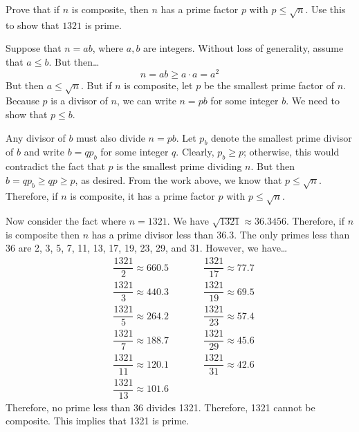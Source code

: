 \documentclass[11pt,letterpaper]{article}
\begin{document}
\newpage



 Prove that if $n$ is composite, then $n$ has a prime factor $p$ with $p \leq \sqrt{n}$. Use this to show that $1321$ is prime. \pspace

\sol Suppose that $n= ab$, where $a, b$ are integers. Without loss of generality, assume that $a \leq b$. But then\dots
	\[
	n= ab \geq a \cdot a= a^2
	\]
But then $a \leq \sqrt{n}$. But if $n$ is composite, let $p$ be the smallest prime factor of $n$. Because $p$ is a divisor of $n$, we can write $n= pb$ for some integer $b$. We need to show that $p \leq b$. \pspace

Any divisor of $b$ must also divide $n= pb$. Let $p_b$ denote the smallest prime divisor of $b$ and write $b= qp_b$ for some integer $q$. Clearly, $p_b \geq p$; otherwise, this would contradict the fact that $p$ is the smallest prime dividing $n$. But then $b= qp_b \geq qp \geq p$, as desired. From the work above, we know that $p \leq \sqrt{n}$. Therefore, if $n$ is composite, it has a prime factor $p$ with $p \leq \sqrt{n}$. \pspace

Now consider the fact where $n= 1321$. We have $\sqrt{1321} \approx 36.3456$. Therefore, if $n$ is composite then $n$ has a prime divisor less than 36.3. The only primes less than 36 are 2, 3, 5, 7, 11, 13, 17, 19, 23, 29, and 31. However, we have\dots
	\[
	\begin{aligned}
	&\dfrac{1321}{2} \approx 660.5 &\qquad &\dfrac{1321}{17} \approx 77.7 \\
	&\dfrac{1321}{3} \approx 440.3 &\qquad &\dfrac{1321}{19} \approx 69.5 \\
	&\dfrac{1321}{5} \approx 264.2 &\qquad &\dfrac{1321}{23} \approx 57.4 \\
	&\dfrac{1321}{7} \approx 188.7 &\qquad &\dfrac{1321}{29} \approx 45.6 \\
	&\dfrac{1321}{11} \approx 120.1 &\qquad &\dfrac{1321}{31} \approx 42.6 \\
	&\dfrac{1321}{13} \approx 101.6
	\end{aligned}
	\]
Therefore, no prime less than 36 divides 1321. Therefore, 1321 cannot be composite. This implies that 1321 is prime. 
\end{document}
